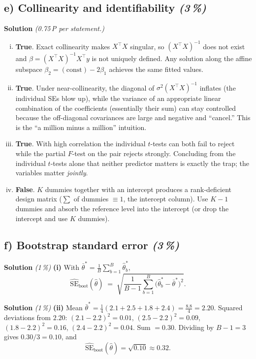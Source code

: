 \documentclass[11pt,a4paper]{article}
\newcommand{\subpoints}[1]{\textit{(#1\,\%)}}
\newcommand{\sol}{\noindent\textbf{Solution}}
\begin{document}
\subsection*{e) Collinearity and identifiability \subpoints{3}}
\sol{} \emph{(0.75\,P per statement.)}
\begin{enumerate}[(i)]
  \item \textbf{True}. Exact collinearity makes $X^\top X$ singular, so $(X^\top X)^{-1}$ does not
        exist and $\hat\beta=(X^\top X)^{-1}X^\top y$ is not uniquely defined. Any solution along
        the affine subspace $\beta_2 = (\text{const}) - 2\beta_1$ achieves the same fitted values.
  \item \textbf{True}. Under near-collinearity, the diagonal of $\sigma^2(X^\top X)^{-1}$ inflates
        (the individual SEs blow up), while the variance of an appropriate linear combination of
        the coefficients (essentially their sum) can stay controlled because the off-diagonal
        covariances are large and negative and ``cancel.'' This is the ``a million minus a million''
        intuition.
  \item \textbf{True}. With high correlation the individual $t$-tests can both fail to reject
        while the partial $F$-test on the pair rejects strongly. Concluding from the individual
        $t$-tests alone that neither predictor matters is exactly the trap; the variables matter
        \emph{jointly}.
  \item \textbf{False}. $K$ dummies together with an intercept produces a rank-deficient design
        matrix ($\sum$ of dummies $\equiv 1$, the intercept column). Use $K-1$ dummies and
        absorb the reference level into the intercept (or drop the intercept and use $K$ dummies).
\end{enumerate}

\subsection*{f) Bootstrap standard error \subpoints{3}}

\sol{} \subpoints{1} \textbf{(i)} With $\bar\theta^* = \frac{1}{B}\sum_{b=1}^B \hat\theta_b^*$,
$$\widehat{\mathrm{SE}}_{\mathrm{boot}}(\hat\theta) \;=\; \sqrt{\frac{1}{B-1}\sum_{b=1}^B
   \bigl(\hat\theta_b^* - \bar\theta^*\bigr)^2}.$$

\medskip
\sol{} \subpoints{1} \textbf{(ii)} Mean
$\bar\theta^* = \tfrac{1}{4}(2.1+2.5+1.8+2.4) = \tfrac{8.8}{4} = 2.20$.
Squared deviations from $2.20$: $(2.1-2.2)^2 = 0.01$,
$(2.5-2.2)^2 = 0.09$, $(1.8-2.2)^2 = 0.16$, $(2.4-2.2)^2 = 0.04$. Sum $= 0.30$.
Dividing by $B-1=3$ gives $0.30/3 = 0.10$, and
$$\widehat{\mathrm{SE}}_{\mathrm{boot}}(\hat\theta) = \sqrt{0.10} \approx \boxed{0.32}.$$
\end{document}
